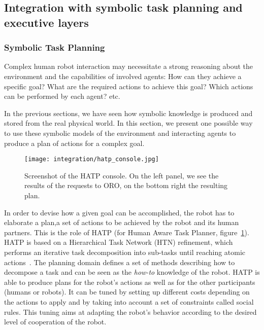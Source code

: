 
\subsection{Integration with symbolic task planning and executive layers}

\subsubsection{Symbolic Task Planning}

Complex human robot interaction may necessitate a strong reasoning about the
environment and the capabilities of involved agents: How can they achieve a
specific goal? What are the required actions to achieve this goal? Which
actions can be performed by each agent? etc.

In the previous sections, we have seen how symbolic knowledge is produced and
stored from the real physical world. In this section, we present one possible
way to use these symbolic models of the environment and interacting agents to
produce a plan of actions for a complex goal.

\begin{figure}
    \centering
    \texttt{[image: integration/hatp\_console.jpg]}
    \caption{Screenshot of the HATP console. On the left panel, we see the
    results of the requests to ORO, on the bottom right the resulting plan.}
    \label{fig|hatp_console}
\end{figure}

In order to devise how a given goal can be accomplished, the robot has to
elaborate a plan,\ie a set of actions to be achieved by the robot and its human
partners.  This is the role of HATP \cite{Alili2008} (for Human Aware Task
Planner, figure~\ref{fig|hatp_console}).  HATP is based on a Hierarchical Task
Network (HTN) refinement, which performs an iterative task decomposition into
sub-tasks until reaching atomic actions~\cite{Nau2003}.  The planning domain
defines a set of methods describing how to decompose a task and can be seen as
the {\it how-to} knowledge of the robot.  HATP is able to produce plans for the
robot's actions as well as for the other participants (humans or robots). It
can be tuned by setting up different costs depending on the actions to apply
and by taking into account a set of constraints called social rules. This
tuning aims at adapting the robot's behavior according to the desired level of
cooperation of the robot.

